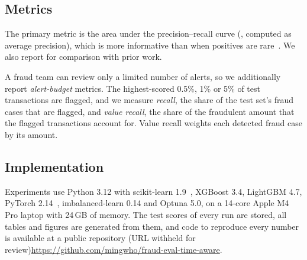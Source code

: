 \subsection{Metrics}

The primary metric is the area under the precision--recall curve (\prauc{}, computed as average precision), which is more informative than \rocauc{} when positives are rare~\cite{davis2006relationship,saito2015precision}. We also report \rocauc{} for comparison with prior work.

A fraud team can review only a limited number of alerts, so we additionally report \emph{alert-budget} metrics. The highest-scored 0.5\%, 1\% or 5\% of test transactions are flagged, and we measure \emph{recall}, the share of the test set's fraud cases that are flagged, and \emph{value recall}, the share of the fraudulent amount that the flagged transactions account for. Value recall weights each detected fraud case by its amount.

\subsection{Implementation}

Experiments use Python 3.12 with scikit-learn 1.9~\cite{pedregosa2011scikit}, XGBoost 3.4, LightGBM 4.7, PyTorch 2.14~\cite{paszke2019pytorch}, imbalanced-learn 0.14 and Optuna 5.0, on a 14-core Apple M4 Pro laptop with 24\,GB of memory. The test scores of every run are stored, all tables and figures are generated from them, and code to reproduce every number is available at \ifanon a public repository (URL withheld for review)\else\url{https://github.com/mingwho/fraud-eval-time-aware}\fi.
